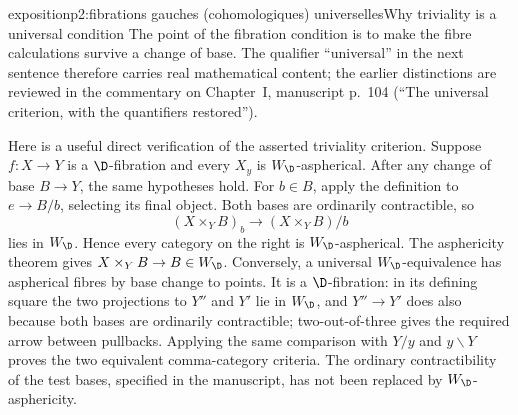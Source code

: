 \begin{dcomment}{exposition}{p2:fibrations gauches (cohomologiques) universelles}{Why triviality is a universal condition}
The point of the fibration condition is to make the fibre calculations survive a change of base. The qualifier ``universal'' in the next sentence therefore carries real mathematical content; the earlier distinctions are reviewed in the commentary on Chapter~I, manuscript p.~104 (``The universal criterion, with the quantifiers restored'').

Here is a useful direct verification of the asserted triviality criterion. Suppose $f:X\to Y$ is a $\D$-fibration and every $X_y$ is $W_{\D}$-aspherical. After any change of base $B\to Y$, the same hypotheses hold. For $b\in B$, apply the definition to $e\to B/b$, selecting its final object. Both bases are ordinarily contractible, so
\[
 (X\times_Y B)_b\longrightarrow (X\times_Y B)/b
\]
lies in $W_{\D}$. Hence every category on the right is $W_{\D}$-aspherical. The asphericity theorem gives $X\times_Y B\to B\in W_{\D}$. Conversely, a universal $W_{\D}$-equivalence has aspherical fibres by base change to points. It is a $\D$-fibration: in its defining square the two projections to $Y''$ and $Y'$ lie in $W_{\D}$, and $Y''\to Y'$ does also because both bases are ordinarily contractible; two-out-of-three gives the required arrow between pullbacks. Applying the same comparison with $Y/y$ and $y\backslash Y$ proves the two equivalent comma-category criteria. The ordinary contractibility of the test bases, specified in the manuscript, has not been replaced by $W_{\D}$-asphericity.
\end{dcomment}

